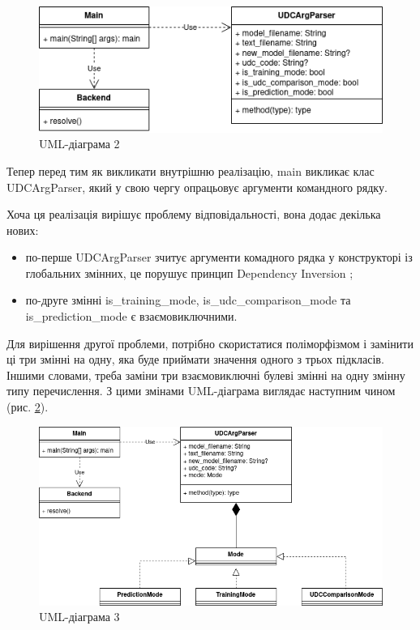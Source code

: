 \documentclass[14pt]{extarticle}
\begin{document}
  \begin{figure}[H]
    \centering
    \includegraphics{io_uml2.drawio.png}    
    \caption{UML-діаграма 2}
    \label{fig:io_uml2}
  \end{figure}

  Тепер перед тим як викликати внутрішню реалізацію,
  main викликає клас UDCArgParser,
  який у свою чергу опрацьовує аргументи командного рядку.
  
  Хоча ця реалізація вирішує проблему відповідальності, вона додає декілька нових:
  \begin{itemize}[labelindent=\dimexpr{}\relax, leftmargin=*]
    \item по-перше UDCArgParser зчитує аргументи комадного рядка
    у конструкторі із глобальних змінних,
    це порушує принцип Dependency Inversion \cite{DI_wiki, SOLID_wiki};
    \item по-друге змінні is\_training\_mode, is\_udc\_comparison\_mode та \\ is\_prediction\_mode є взаємовиключними.
  \end{itemize}

  Для вирішення другої проблеми, потрібно скористатися поліморфізмом
  \cite{Polymorphism_wiki, Subtyping_wiki, Dynamic_dispatch_wiki}
  і замінити ці три змінні на одну,
  яка буде приймати значення одного з трьох підкласів.
  Іншими словами, треба заміни три взаємовиключні булеві змінні
  на одну змінну типу перечислення.
  З цими змінами UML-діаграма виглядає наступним чином (рис. \ref{fig:io_uml3}).

  \begin{figure}[H]
    \centering
    \includegraphics[width=\textwidth]{io_uml3.drawio.png}    
    \caption{UML-діаграма 3}
    \label{fig:io_uml3}
  \end{figure}
  
\end{document}
